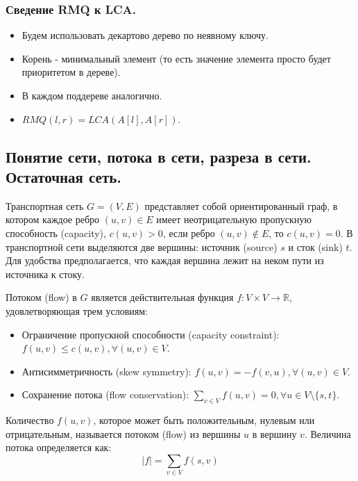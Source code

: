 \documentclass[a4paper,14pt]{article}
\begin{document}
    \subsubsection*{Сведение RMQ к LCA.}
    \begin{itemize}
        \item Будем использовать декартово дерево по неявному ключу.
        \item Корень - минимальный элемент (то есть значение элемента
        просто будет приоритетом в дереве).
        \item В каждом поддереве аналогично.
        \item $RMQ(l,r) = LCA(A[l],A[r])$.
    \end{itemize}

    \subsection{Понятие сети, потока в сети, разреза в сети. Остаточная сеть.}
    \label{subsec:flow_network}
    \begin{Def}
        Транспортная сеть $G = (V,E)$ представляет собой ориентированный
граф, в котором каждое ребро $(u,v) \in E$ имеет неотрицательную
пропускную способность (capacity), $c(u,v) > 0$, если ребро $(u,v) \notin E$,
то $c(u,v) = 0$. В транспортной сети выделяются две вершины:
источник (source) $s$ и сток (sink) $t$. Для удобства предполагается,
что каждая вершина лежит на неком пути из источника к стоку.
    \end{Def}
    \begin{Def}
        Потоком (flow) в $G$ является действительная функция
        $f : V\times V \rightarrow \mathbb{R}$, удовлетворяющая трем условиям:
        \begin{itemize}
            \item Ограничение пропускной способности (capacity constraint): $f(u, v) \leqslant c(u, v), \forall (u, v) \in V$.
            \item Антисимметричность (skew symmetry): $f(u, v) = -f(v, u), \forall (u, v) \in V$.
            \item Сохранение потока (flow conservation): $\sum\limits_{v \in V} f(u, v) = 0, \forall u \in V \setminus \{s, t\}$.
        \end{itemize}
    \end{Def}
    \begin{Def}
        Количество $f(u,v)$, которое может быть положительным, нулевым
или отрицательным, называется потоком (flow) из вершины $u$ в
вершину $v$. Величина потока определяется как:
        \[
        |f| = \sum\limits_{v \in V} f(s, v)
        \]
    \end{Def}
\end{document}
